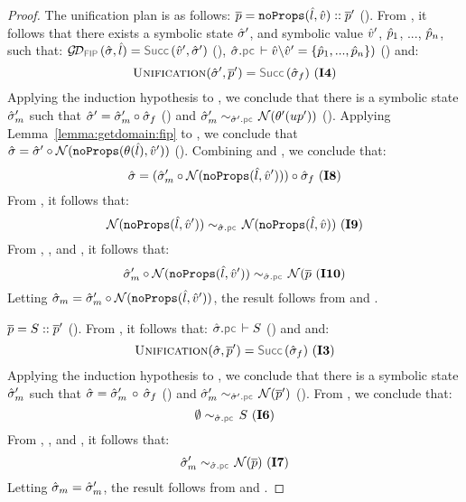 \begin{proof}
\noindent {} The unification plan is as follows: 
$\overline{p} = \texttt{noProps}(\hat{l}, \hat{v}) :: \overline{p}'$ (). 
From , it follows that there exists a symbolic state $\hat{\sigma}'$,
and symbolic value $\hat{v}'$, $\hat{p}_1$, ..., $\hat{p}_n$, such that: 
$\GetDomainV{\sstate, \sloc} = \success{\sexprv', \sstate'}$ (), 
$
\sstate.\pcsel \vdash \sexprv \backslash \sexprv' = \{ \sexprp_1, ..., \sexprp_n \})
$ () and: 
$$
\unificationfunction(\sstate', \jvec{\spass}') = \success{\sstate_f} \text{ (\ieq{4})}
$$
Applying the induction hypothesis to , we conclude that there is a symbolic state 
$\hat{\sigma}_m'$ such that  $\hat{\sigma}' = \hat{\sigma}_m' \circ \hat{\sigma}_f$ () and
$\stateequivrel{\sstate_m'}{\normaliser(\subst'(\up'))}{\sstate'.\pcsel}$ (). 
%
Applying Lemma~\ref{lemma:getdomain:fip} to , we conclude that 
$\hat{\sigma} = \hat{\sigma}' \circ \mathcal{N}(\texttt{noProps}(\theta(\hat{l}), \hat{v}'))$ (). 
%
Combining  and , we conclude that: 
$$
\hat{\sigma} = (\hat{\sigma}_m' \circ \mathcal{N}(\texttt{noProps}(\hat{l}, \hat{v}'))) \circ \hat{\sigma}_f  \text{ ({\bf I8})}
$$
From  , it follows that: 
$$
\stateequivrel{\normaliser(\emptyfields{\sloc}{\sexprv'})}{\normaliser(\emptyfields{\sloc}{\sexprv})}{\sstate.\pcsel} \text{ (\ieq{9})}
$$
From , , and , it follows that: 
$$
\stateequivrel{\sstate_m' \statecompose \normaliser(\emptyfields{\sloc}{\sexprv'})}{\normaliser(\jvec{\spass}}{\sstate.\pcsel} \text{ (\ieq{10})}
$$
Letting $\hat{\sigma}_m = \hat{\sigma}_m' \circ \mathcal{N}(\texttt{noProps}(\hat{l}, \hat{v}'))$, the result follows 
from  and . 
\vspace{5pt}


\noindent {}
$\overline{p} = S :: \overline{p}'$ (). 
From , it follows that: 
$\sstate.\pcsel \vdash \sass$ () and 
and:
$$
\unificationfunction(\sstate, \jvec{\spass}') = \success{\sstate_f} \text{ (\ieq{3})}
$$
%
Applying the induction hypothesis to , we conclude that there is a symbolic state 
$\hat{\sigma}_m'$ such that  $\hat{\sigma} = \hat{\sigma}_m' \, \circ  \, \hat{\sigma}_f$ () and
$\stateequivrel{\sstate_m'}{\normaliser(\jvec{\spass}')}{\sstate'.\pcsel}$ (). 
From , we conclude that: 
$$
\stateequivrel{\emptystate}{\sass}{\sstate.\pcsel} \text{ (\ieq{6})}
$$
From , , and , it follows that: 
$$
\stateequivrel{\sstate_m'}{\normaliser(\jvec{\spass})}{\sstate.\pcsel} \text{ (\ieq{7})}
$$
Letting $\hat{\sigma}_m = \hat{\sigma}_m'$, the result follows 
from  and .
\end{proof}
 
